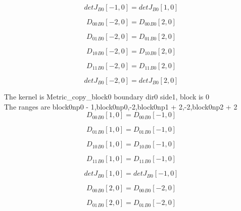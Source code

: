 \documentclass{article}
\begin{document}
\begin{dmath}{detJ{_{B0}}}[{-1,0}] = {detJ{_{B0}}}[{1,0}]\end{dmath}

\begin{dmath}{D_{00}{_{B0}}}[{-2,0}] = {D_{00}{_{B0}}}[{2,0}]\end{dmath}

\begin{dmath}{D_{01}{_{B0}}}[{-2,0}] = {D_{01}{_{B0}}}[{2,0}]\end{dmath}

\begin{dmath}{D_{10}{_{B0}}}[{-2,0}] = {D_{10}{_{B0}}}[{2,0}]\end{dmath}

\begin{dmath}{D_{11}{_{B0}}}[{-2,0}] = {D_{11}{_{B0}}}[{2,0}]\end{dmath}

\begin{dmath}{detJ{_{B0}}}[{-2,0}] = {detJ{_{B0}}}[{2,0}]\end{dmath}

\noindent The kernel is Metric_copy_block0 boundary dir0 side1, block is 0\\\noindent The ranges are block0np0 - 1,block0np0,-2,block0np1 + 2,-2,block0np2 + 2\\\begin{dmath}{D_{00}{_{B0}}}[{1,0}] = {D_{00}{_{B0}}}[{-1,0}]\end{dmath}

\begin{dmath}{D_{01}{_{B0}}}[{1,0}] = {D_{01}{_{B0}}}[{-1,0}]\end{dmath}

\begin{dmath}{D_{10}{_{B0}}}[{1,0}] = {D_{10}{_{B0}}}[{-1,0}]\end{dmath}

\begin{dmath}{D_{11}{_{B0}}}[{1,0}] = {D_{11}{_{B0}}}[{-1,0}]\end{dmath}

\begin{dmath}{detJ{_{B0}}}[{1,0}] = {detJ{_{B0}}}[{-1,0}]\end{dmath}

\begin{dmath}{D_{00}{_{B0}}}[{2,0}] = {D_{00}{_{B0}}}[{-2,0}]\end{dmath}

\begin{dmath}{D_{01}{_{B0}}}[{2,0}] = {D_{01}{_{B0}}}[{-2,0}]\end{dmath}
\end{document}
